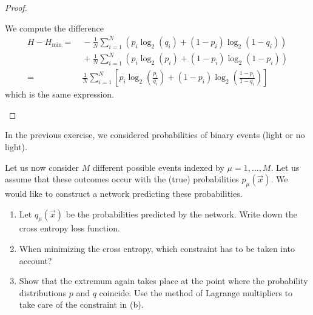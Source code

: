 \begin{proof}
\begin{parts}
	We compute the difference
	\begin{align*}
		H-H_\text{min} =&~ -\frac{1}{N}\sum_{i=1}^{N} (p_i \log_2(q_i)+(1-p_i)\log_2 (1-q_i)) \\
			       &~+ \frac{1}{N}\sum_{i=1}^{N} (p_i \log_2(p_i) + (1-p_i) \log_2 (1-p_i)) \\
		=&~ \frac{1}{N}\sum_{i=1}^{N} \left[ p_i \log_2 \left( \frac{p_i}{q_i} \right) + (1-p_i) \log_2 \left( \frac{1-p_i}{1-q_i} \right)  \right] 
	\end{align*}
	which is the same expression.\qedhere
\end{parts}	
\end{proof}

\begin{Problem}
In the previous exercise, we considered probabilities of binary events
(light or no light).

Let us now consider $M$ different possible events indexed by
$\mu=1,\ldots,M$.
Let us assume that these outcomes occur with the (true) probabilities
$p_\mu(\vec x)$.
We would like to construct a network predicting these probabilities.

\begin{enumerate}
\item[(a)] Let $q_\mu(\vec x)$ be the probabilities predicted by the network.
Write down the cross entropy loss function.

\item[(b)] When minimizing the cross entropy, which constraint has to be taken
into account?

\item[(c)] Show that the extremum again takes place at the point where the
probability distributions $p$ and $q$ coincide.
Use the method of Lagrange multipliers to take care of the constraint in (b).
\end{enumerate}
\end{Problem}

